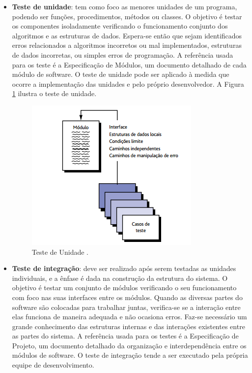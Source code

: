 \begin{itemize}

\item {\textbf{Teste de unidade}}: tem como foco as menores unidades de um programa, podendo ser funções, procedimentos, métodos ou classes. O objetivo é testar os componentes isoladamente verificando o funcionamento conjunto dos algoritmos e as estruturas de dados. Espera-se então que sejam identificados erros relacionados a algoritmos incorretos ou mal implementados, estruturas de dados incorretas, ou simples erros de programação.  A referência usada para os teste é a Especificação de Módulos, um documento detalhado de cada módulo de software. O teste de unidade pode ser aplicado à medida que ocorre a implementação das unidades e pelo próprio desenvolvedor. A Figura \ref{figure:testedeunidade} ilustra o teste de unidade.

\begin{figure}[!htb]
\centering
\includegraphics[width=.5\textwidth]{images/testedeunidade.png}
\caption{Teste de Unidade \cite{PRESSMAN2016}.}
\label{figure:testedeunidade}
\end{figure}

\item {\textbf{Teste de integração}}: deve ser realizado após serem testadas as unidades individuais, e a ênfase é dada na construção da estrutura do sistema. O objetivo é testar um conjunto de módulos verificando o seu funcionamento com foco nas suas interfaces entre os módulos. Quando as diversas partes do software são colocadas para trabalhar juntas, verifica-se se a interação entre elas funciona de maneira adequada e não ocasiona erros. Faz-se necessário um grande conhecimento das estruturas internas e das interações existentes entre as partes do sistema. A referência usada para os testes é a Especificação de Projeto, um documento detalhado da organização e interdependência entre os módulos de software. O teste de integração tende a ser executado pela própria equipe de desenvolvimento. 


\end{itemize}
